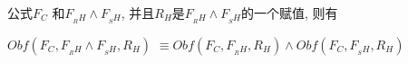 %
%
\begin{lemma}\label{3:ANDrelation-Holding-Obfuscation}
公式$F_C$ 和$F_{_RH}\wedge F_{_SH}$,
并且$R_H$是$F_{_RH} \wedge F_{_SH}$的一个赋值, 则有

$Obf(F_C,F_{_RH} \wedge F_{_SH},R_H) $
$\equiv Obf(F_C,F_{_RH},R_H) \wedge Obf(F_C,F_{_SH} ,R_H)$
\end{lemma}
